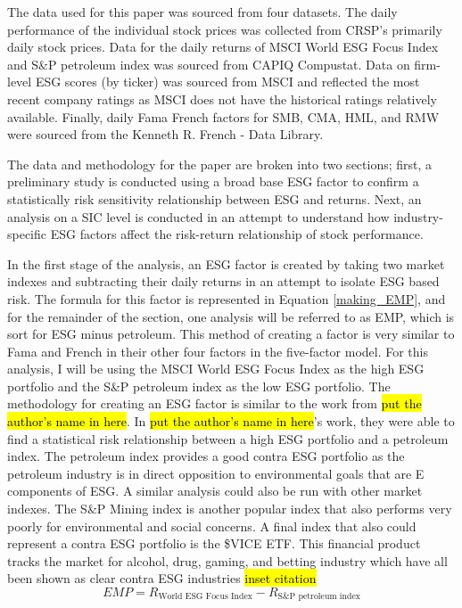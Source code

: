 The data used for this paper was sourced from four datasets. The daily performance of the individual stock prices was collected from CRSP's primarily daily stock prices. Data for the daily returns of MSCI World ESG Focus Index and S\&P petroleum index was sourced from CAPIQ Compustat. Data on firm-level ESG scores (by ticker) was sourced from MSCI and reflected the most recent company ratings as MSCI does not have the historical ratings relatively available. Finally, daily Fama French factors for SMB, CMA, HML, and RMW were sourced from the Kenneth R. French - Data Library.  


The data and methodology for the paper are broken into two sections; first, a preliminary study is conducted using a broad base ESG factor to confirm a statistically risk sensitivity relationship between ESG and returns. Next, an analysis on a SIC level is conducted in an attempt to understand how industry-specific ESG factors affect the risk-return relationship of stock performance. 

In the first stage of the analysis, an ESG factor is created by taking two market indexes and subtracting their daily returns in an attempt to isolate ESG based risk. The formula for this factor is represented in Equation \eqref{making_EMP}, and for the remainder of the section, one analysis will be referred to as EMP, which is sort for ESG minus petroleum. This method of creating a factor is very similar to Fama and French in their other four factors in the five-factor model. For this analysis, I will be using the MSCI World ESG Focus Index as the high ESG portfolio and the  S\&P petroleum index as the low ESG portfolio. The methodology for creating an ESG factor is similar to the work from \hl{put the author's name in here}. In \hl{put the author's name in here}'s work, they were able to find a statistical risk relationship between a high ESG portfolio and a petroleum index\cite{Frynas2005TheFD}. The petroleum index provides a good contra ESG portfolio as the petroleum industry is in direct opposition to environmental goals that are E components of ESG. A similar analysis could also be run with other market indexes. The S\&P Mining index is another popular index that also performs very poorly for environmental and social concerns\cite{Kapelus2002MiningCS}. A final index that also could represent a contra ESG portfolio is the  \$VICE ETF. This financial product tracks the market for  alcohol, drug, gaming, and betting industry which have all been shown as clear contra ESG industries \hl{inset citation}
\begin{equation}
    \label{making_EMP}
    EMP = R_{\text{World ESG Focus Index}}- R_{\text{S\&P petroleum index}}
\end{equation}



